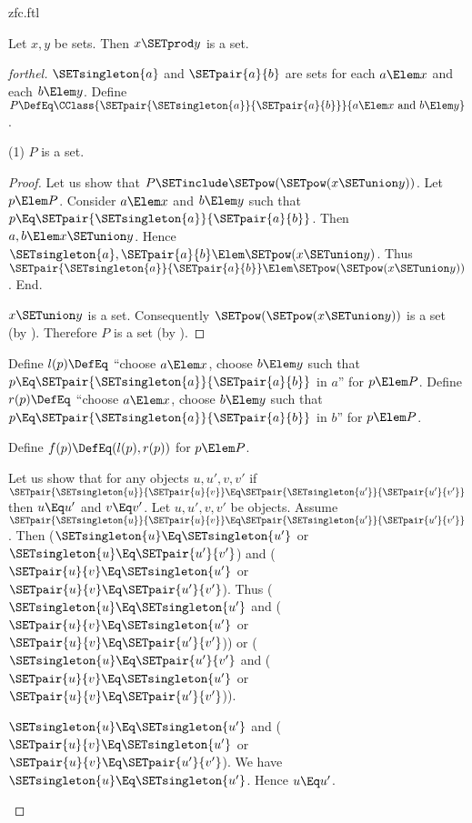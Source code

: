 \documentclass{stex}
\begin{document}
\begin{smodule}{zfc.ftl}
\begin{proposition}[forthel]
  Let $x, y$ be sets.
  Then $x \SETprod y$ is a set.
\end{proposition}
\begin{proof}[forthel]
  $\SETsingleton{a}$ and $\SETpair{a}{b}$ are sets for each $a \Elem x$ and each $b \Elem y$.
  Define $P \DefEq \CClass{\SETpair{\SETsingleton{a}}{\SETpair{a}{b}}}{a \Elem x\text{ and }b \Elem y}$.

  (1) $P$ is a set.
  \begin{proof}
    Let us show that $P \SETinclude \SETpow(\SETpow(x \SETunion y))$.
      Let $p \Elem P$.
      Consider $a \Elem x$ and $b \Elem y$ such that $p \Eq \SETpair{\SETsingleton{a}}{\SETpair{a}{b}}$.
      Then $a, b \Elem x \SETunion y$.
      Hence $\SETsingleton{a}, \SETpair{a}{b} \Elem \SETpow(x \SETunion y)$.
      Thus $\SETpair{\SETsingleton{a}}{\SETpair{a}{b}} \Elem \SETpow(\SETpow(x \SETunion y))$.
    End.

    $x \SETunion y$ is a set.
    Consequently $\SETpow(\SETpow(x \SETunion y))$ is a set (by ).
    Therefore $P$ is a set (by ).
  \end{proof}

  Define $l(p) \DefEq$ ``choose $a \Elem x$, choose $b \Elem y$ such that $p \Eq \SETpair{\SETsingleton{a}}{\SETpair{a}{b}}$ in $a$'' for $p \Elem P$.
  Define $r(p) \DefEq$ ``choose $a \Elem x$, choose $b \Elem y$ such that $p \Eq \SETpair{\SETsingleton{a}}{\SETpair{a}{b}}$ in $b$'' for $p \Elem P$.

  Define $f(p) \DefEq (l(p), r(p))$ for $p \Elem P$.

  Let us show that for any objects $u, u', v, v'$ if
  $\SETpair{\SETsingleton{u}}{\SETpair{u}{v}} \Eq \SETpair{\SETsingleton{u'}}{\SETpair{u'}{v'}}$ then $u \Eq u'$ and $v \Eq v'$.
    Let $u, u', v, v'$ be objects.
    Assume $\SETpair{\SETsingleton{u}}{\SETpair{u}{v}} \Eq \SETpair{\SETsingleton{u'}}{\SETpair{u'}{v'}}$.
    Then ($\SETsingleton{u} \Eq \SETsingleton{u'}$ or $\SETsingleton{u} \Eq \SETpair{u'}{v'}$) and ($\SETpair{u}{v} \Eq \SETsingleton{u'}$ or $\SETpair{u}{v} \Eq \SETpair{u'}{v'}$).
    Thus ($\SETsingleton{u} \Eq \SETsingleton{u'}$ and ($\SETpair{u}{v} \Eq \SETsingleton{u'}$ or $\SETpair{u}{v} \Eq \SETpair{u'}{v'}$)) or ($\SETsingleton{u} \Eq \SETpair{u'}{v'}$ and ($\SETpair{u}{v} \Eq \SETsingleton{u'}$ or $\SETpair{u}{v} \Eq \SETpair{u'}{v'}$)).

    \begin{case}{$\SETsingleton{u} \Eq \SETsingleton{u'}$ and ($\SETpair{u}{v} \Eq \SETsingleton{u'}$ or $\SETpair{u}{v} \Eq \SETpair{u'}{v'}$).}
      We have $\SETsingleton{u} \Eq \SETsingleton{u'}$.
      Hence $u \Eq u'$.


\end{case}
\end{proof}
\end{smodule}
\end{document}
